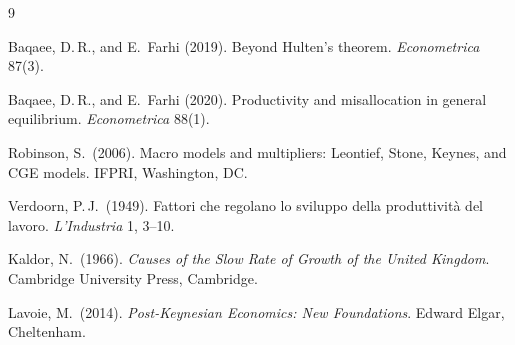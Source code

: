 \documentclass[11pt]{article}
\begin{document}
\begin{thebibliography}{9}

Baqaee, D.\,R., and E.\ Farhi (2019). Beyond Hulten's theorem.
\emph{Econometrica} 87(3).

Baqaee, D.\,R., and E.\ Farhi (2020). Productivity and misallocation in
general equilibrium. \emph{Econometrica} 88(1).

Robinson, S.\ (2006). Macro models and multipliers: Leontief, Stone, Keynes,
and CGE models. IFPRI, Washington, DC.

Verdoorn, P.\,J.\ (1949). Fattori che regolano lo sviluppo della produttivit\`a
del lavoro. \emph{L'Industria} 1, 3--10.

Kaldor, N.\ (1966). \emph{Causes of the Slow Rate of Growth of the United
Kingdom}. Cambridge University Press, Cambridge.

Lavoie, M.\ (2014). \emph{Post-Keynesian Economics: New Foundations}.
Edward Elgar, Cheltenham.

\end{thebibliography}
\end{document}
